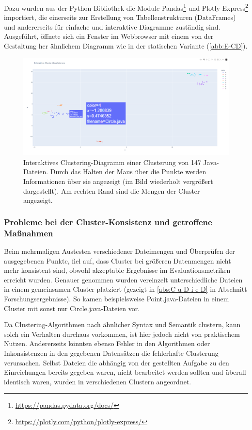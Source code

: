 Dazu wurden aus der Python-Bibliothek die Module Pandas\footnote{\url{https://pandas.pydata.org/docs/}} und Plotly Express\footnote{\url{https://plotly.com/python/plotly-express/}} importiert, die einerseits zur Erstellung von Tabellenstrukturen (DataFrames) und andererseits für einfache und interaktive Diagramme zuständig sind. Ausgeführt, öffnete sich ein Fenster im Webbrowser mit einem von der Gestaltung her ähnlichem Diagramm wie in der statischen Variante (\ref{abb:E-CD}).

\begin{figure} %
	\centering
	\includegraphics[width=1.0\textwidth]{images/Interaktives Clustering-Diagramm.pdf}
	\caption{Interaktives Clustering-Diagramm einer Clusterung von 147 Java-Dateien. Durch das Halten der Maus über die Punkte werden Informationen über sie angezeigt (im Bild wiederholt vergrößert dargestellt). Am rechten Rand sind die Mengen der Cluster angezeigt.}
	\label{abb:I-CD}
\end{figure}


\subsubsection*{Probleme bei der Cluster-Konsistenz und getroffene Maßnahmen}
Beim mehrmaligen Austesten verschiedener Dateimengen und Überprüfen der ausgegebenen Punkte, fiel auf, dass Cluster bei größeren Datenmengen nicht mehr konsistent sind, obwohl akzeptable Ergebnisse im Evaluationsmetriken erreicht wurden. Genauer genommen wurden vereinzelt unterschiedliche Dateien in einem gemeinsamen Cluster platziert (gezeigt in \ref{abs:C-u-D-i-e-D} in Abschnitt Forschungsergebnisse). So kamen beispielsweise Point.java-Dateien in einem Cluster mit sonst nur Circle.java-Dateien vor.

Da Clustering-Algorithmen nach ähnlicher Syntax und Semantik clustern, kann solch ein Verhalten durchaus vorkommen, ist hier jedoch nicht von praktischem Nutzen. Andererseits könnten ebenso Fehler in den Algorithmen oder Inkonsistenzen in den gegebenen Datensätzen die fehlerhafte Clusterung verursachen. Selbst Dateien die abhängig von der gestellten Aufgabe zu den Einreichungen bereits gegeben waren, nicht bearbeitet werden sollten und überall identisch waren, wurden in verschiedenen Clustern angeordnet.

